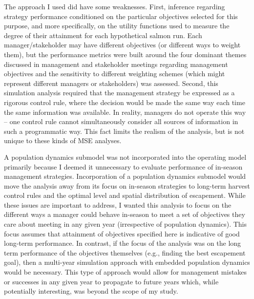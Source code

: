 \documentclass[12pt,]{book}
\theoremstyle{definition}
\theoremstyle{definition}
\theoremstyle{definition}
\theoremstyle{remark}
\begin{document}
The approach I used did have some weaknesses. First, inference regarding
strategy performance conditioned on the particular objectives selected
for this purpose, and more specifically, on the utility functions used
to measure the degree of their attainment for each hypothetical salmon
run. Each manager/stakeholder may have different objectives (or
different ways to weight them), but the performance metrics were built
around the four dominant themes discussed in management and stakeholder
meetings regarding management objectives and the sensitivity to
different weighting schemes (which might represent different managers or
stakeholders) was assessed. Second, this simulation analysis required
that the management strategy be expressed as a rigorous control rule,
where the decision would be made the same way each time the same
information was available. In reality, managers do not operate this way
-- one control rule cannot simultaneously consider all sources of
information in such a programmatic way. This fact limits the realism of
the analysis, but is not unique to these kinds of MSE analyses.

A population dynamics submodel was not incorporated into the operating
model primarily because I deemed it unnecessary to evaluate performance
of in-season management strategies. Incorporation of a population
dynamics submodel would move the analysis away from its focus on
in-season strategies to long-term harvest control rules and the optimal
level and spatial distribution of escapement. While these issues are
important to address, I wanted this analysis to focus on the different
ways a manager could behave in-season to meet a set of objectives they
care about meeting in any given year (irrespective of population
dynamics). This focus assumes that attainment of objectives specified
here is indicative of good long-term performance. In contrast, if the
focus of the analysis was on the long term performance of the objectives
themselves (e.g., finding the best escapement goal), then a multi-year
simulation approach with embedded population dynamics would be
necessary. This type of approach would allow for management mistakes or
successes in any given year to propagate to future years which, while
potentially interesting, was beyond the scope of my study.
\end{document}
